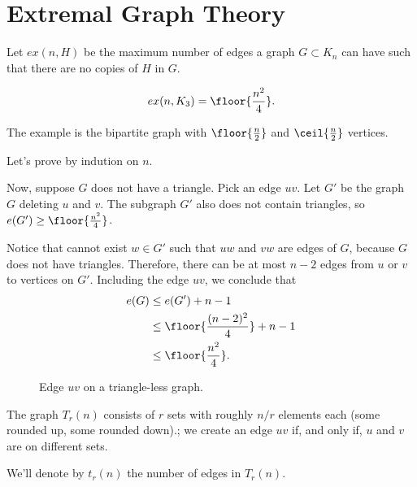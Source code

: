 \newpage
\section{Extremal Graph Theory}

\begin{defn}
	Let $ex(n, H)$ be the maximum number of edges a graph  $G \subset K_n$ can have such that there are no copies of $H$ in $G$.
\end{defn}

\begin{thm}[Mantel, 1907]
	\[
		ex(n, K_3) = \floor{\frac{n^2}{4}}.
	\]
\end{thm}

\begin{dem}
	The example is the bipartite graph with $\floor{\frac{n}{2}}$ and $\ceil{\frac{n}{2}}$ vertices.

	Let's prove by indution on $n$.

	Now, suppose $G$ does not have a triangle.
	Pick an edge $uv$. Let $G'$ be the graph $G$ deleting $u$ and $v$. The subgraph $G'$ also does not contain triangles, so $e(G') \ge \floor{\frac{n^2}{4}}$.

	Notice that cannot exist $w \in G'$ such that $uw$ and $vw$ are edges of $G$, because $G$ does not have triangles. Therefore, there can be at most $n-2$ edges from $u$ or $v$ to vertices on $G'$. Including the edge $uv$, we conclude that
	\begin{align*}
		e(G) &\le e(G') + n - 1\\
			 &\le \floor{\frac{(n-2)^2}{4}} + n - 1\\
			 &\le \floor{\frac{n^2}{4}}.
	\end{align*}
\end{dem}

\begin{figure}[ht]
    \centering
    \caption{Edge $uv$ on a triangle-less graph.}
    \label{fig:edge-uv-on-a-triangle-less-graph}
\end{figure}

\begin{defn}
	The graph $T_r(n)$ consists of $r$ sets with roughly $n/r$ elements each (some rounded up, some rounded down).; we create an edge $uv$ if, and only if, $u$ and $v$ are on different sets.

	We'll denote by $t_r(n)$ the number of edges in $T_r(n)$.
\end{defn}

